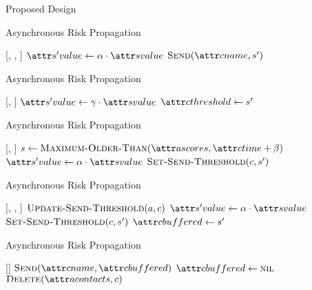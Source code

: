 \documentclass[11pt]{beamer}
\begin{document}
\begin{section}{Proposed Design}
\begin{frame}{Asynchronous Risk Propagation}
\begin{function}{\nApplyRiskScore}[\vActor, \vContact, \vScore]
  \If{$\aContactTime + \pTimeBuffer > \aScoreTime$}
    \pause
    \State $\aNewScoreValue \assign \pTransmissionRate \cdot \aScoreValue$
    \pause
    \State $\cSend[\aContactName, \vNewScore]$
  \EndIf
\end{function}
\end{frame}

\begin{frame}{Asynchronous Risk Propagation}
\begin{function}{\nSetSendThreshold}[\vContact, \vScore]
  \State $\aNewScoreValue \assign \pSendCoefficient \cdot \aScoreValue$
  \pause
  \State $\aContactThreshold \assign \vNewScore$
\end{function}
\end{frame}

\begin{frame}{Asynchronous Risk Propagation}
\begin{function}{\nUpdateSendThreshold}[\vActor, \vContact]
    \pause
      \pause
      \State $\vScore \assign \cMaximumOlderThan[\aActorScores, \aContactTime + \pTimeBuffer]$
        \pause
      \State $\aNewScoreValue \assign \pTransmissionRate \cdot \aScoreValue$
        \pause
      \State $\cSetSendThreshold[\vContact, \vNewScore]$
    \EndIf
  \EndIf
\end{function}
\end{frame}

\begin{frame}{Asynchronous Risk Propagation}
\begin{function}{\nApplyRiskScore}[\vActor, \vContact, \vScore]
  \State $\cUpdateSendThreshold[\vActor, \vContact]$
  \pause
  \If{$\aContactThresholdValue < \aScoreValue \AND \aContactTime + \pTimeBuffer > \aScoreTime$}
    \pause
    \State $\aNewScoreValue \assign \pTransmissionRate \cdot \aScoreValue$
    \pause
    \State $\cSetSendThreshold[\vContact, \vNewScore]$
    \pause
    \State $\aContactBuffered \assign \vNewScore$
  \EndIf
\end{function}
\end{frame}

\begin{frame}{Asynchronous Risk Propagation}
\begin{function}{\nHandleFlushTimeout}[\vActor]
  \ForEach{$\vContact \in \aActorContacts$}
    \pause
    \If{$\aContactBuffered \notEquals \nil$}
      \pause
      \State $\cSend[\aContactName, \aContactBuffered]$
      \pause
      \State $\aContactBuffered \assign \nil$
    \EndIf
    \pause
      \State $\cDelete[\aActorContacts, \vContact]$
    \EndIf
  \EndFor
\end{function}
\end{frame}


\end{section}
\end{document}
